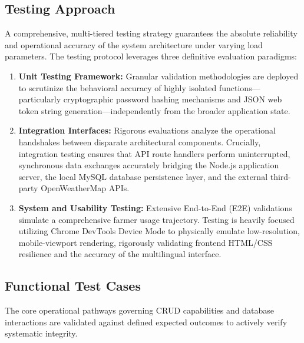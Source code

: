 \subsection{Testing Approach}
A comprehensive, multi-tiered testing strategy guarantees the absolute reliability and operational accuracy of the system architecture under varying load parameters. The testing protocol leverages three definitive evaluation paradigms:
\begin{enumerate}
    \item \textbf{Unit Testing Framework:} Granular validation methodologies are deployed to scrutinize the behavioral accuracy of highly isolated functions—particularly cryptographic password hashing mechanisms and JSON web token string generation—independently from the broader application state.
    \item \textbf{Integration Interfaces:} Rigorous evaluations analyze the operational handshakes between disparate architectural components. Crucially, integration testing ensures that API route handlers perform uninterrupted, synchronous data exchanges accurately bridging the Node.js application server, the local MySQL database persistence layer, and the external third-party OpenWeatherMap APIs.
    \item \textbf{System and Usability Testing:} Extensive End-to-End (E2E) validations simulate a comprehensive farmer usage trajectory. Testing is heavily focused utilizing Chrome DevTools Device Mode to physically emulate low-resolution, mobile-viewport rendering, rigorously validating frontend HTML/CSS resilience and the accuracy of the multilingual interface.
\end{enumerate}

\subsection{Functional Test Cases}
The core operational pathways governing CRUD capabilities and database interactions are validated against defined expected outcomes to actively verify systematic integrity.


